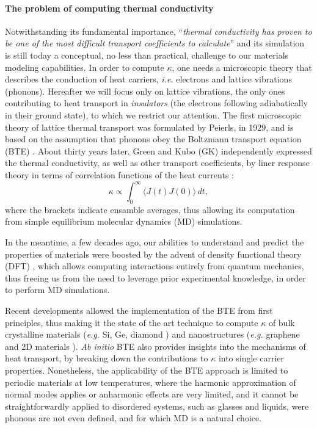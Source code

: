 \paragraph{The problem of computing thermal conductivity}

Notwithstanding its fundamental importance, ``\emph{thermal conductivity has proven to be one of the most difficult transport coefficients to calculate}'' \cite{Evans1990} and its simulation is still today a conceptual, no less than practical, challenge to our materials modeling capabilities. 
In order to compute $\kappa$, one needs a microscopic theory that describes the conduction of heat carriers, \emph{i.e.} electrons and lattice vibrations (phonons). Hereafter we will focus only on lattice vibrations, the only ones contributing to heat transport in \emph{insulators} (the electrons following adiabatically in their ground state), to which we restrict our attention. 
The first microscopic theory of lattice thermal transport was formulated by Peierls, in 1929, and is based on the assumption that phonons obey the Boltzmann transport equation (BTE) \cite{Peierls1929}. 
About thirty years later, Green and Kubo (GK) independently expressed the thermal conductivity, as well as other transport coefficients, by liner response theory in terms of correlation functions of the heat currents \cite{Green1952,Green1954,Kubo1957a,Kubo1957b,Zwanzig1965}:
\begin{equation}
    \kappa \propto \int_{0}^{\infty}\!\langle{J}(t){J}(0)\rangle\, dt, \label{eq:GK-intro}
\end{equation}
where the brackets indicate ensamble averages, thus allowing its computation from simple equilibrium molecular dynamics (MD) simulations. 

In the meantime, a few decades ago, our abilities to understand and predict the properties of materials were boosted by the advent of density functional theory (DFT) \LE{[***REF***]}, which allows computing interactions entirely from quantum mechanics, thus freeing us from the need to leverage prior experimental knowledge, in order to perform MD simulations. 

Recent developments allowed the implementation of the BTE from first principles, thus making it the state of the art technique to compute $\kappa$ of bulk crystalline materials (\emph{e.g.} Si, Ge, diamond \cite{Broido:2007iu,Ward2009}) and nanostructures (\emph{e.g.} graphene and 2D materials \cite{Fugallo2014}). \emph{Ab initio} BTE also provides insights into the mechanisms of heat transport, by breaking down the contributions to $\kappa$ into single carrier properties. 
Nonetheless, the applicability of the BTE approach is limited to periodic materials at low temperatures, where the harmonic approximation of normal modes applies or anharmonic effects are very limited, and it cannot be straightforwardly applied to disordered systems, such as glasses and liquids, were phonons are not even defined, and for which MD is a natural choice. 

